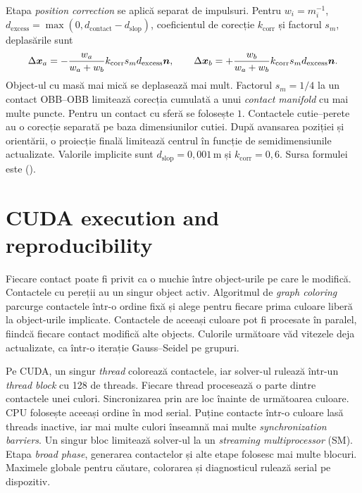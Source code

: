 \documentclass[11pt,a4paper]{article}
\begin{document}
Etapa \emph{position correction} se aplică separat de impulsuri. Pentru
\(w_i=m_i^{-1}\), \(d_{\mathrm{excess}}=\max(0,d_{\mathrm{contact}}-d_{\mathrm{slop}})\),
coeficientul de corecție \(k_{\mathrm{corr}}\) și factorul \(s_m\), deplasările sunt
\begin{equation}
 \Delta\boldsymbol{x}_a=-\frac{w_a}{w_a+w_b}k_{\mathrm{corr}} s_md_{\mathrm{excess}}\boldsymbol{n},
 \qquad
 \Delta\boldsymbol{x}_b=+\frac{w_b}{w_a+w_b}k_{\mathrm{corr}} s_md_{\mathrm{excess}}\boldsymbol{n}.
\end{equation}
Object-ul cu masă mai mică se deplasează mai mult. Factorul
\(s_m=1/4\) la un contact OBB--OBB limitează corecția cumulată
a unui \emph{contact manifold} cu mai multe puncte. Pentru un contact cu
sferă se folosește \(1\). Contactele cutie--perete au o
corecție separată pe baza dimensiunilor cutiei. După avansarea
poziției și orientării, o proiecție finală limitează
centrul în funcție de semidimensiunile actualizate.
Valorile implicite sunt \(d_{\mathrm{slop}}=0{,}001\,\mathrm m\) și
\(k_{\mathrm{corr}}=0{,}6\). Sursa formulei este 
().

\section{CUDA execution and reproducibility}

Fiecare contact poate fi privit ca o muchie între object-urile pe
care le modifică. Contactele cu pereții au un singur object activ.
Algoritmul de \emph{graph coloring} parcurge contactele într-o ordine fixă și alege
pentru fiecare prima culoare liberă la object-urile implicate.
Contactele de aceeași culoare pot fi procesate în paralel,
fiindcă fiecare contact modifică alte objects. Culorile următoare văd vitezele
deja actualizate, ca într-o iterație Gauss--Seidel pe grupuri.

Pe CUDA, un singur \emph{thread} colorează contactele, iar solver-ul
rulează într-un \emph{thread block} cu 128 de threads. Fiecare thread
procesează o parte dintre contactele unei culori. Sincronizarea prin
 are loc înainte
de următoarea culoare. CPU folosește aceeași ordine în mod
serial. Puține contacte într-o culoare lasă threads inactive,
iar mai multe culori înseamnă mai multe \emph{synchronization barriers}.
Un singur bloc limitează solver-ul la un \emph{streaming multiprocessor}
(SM). Etapa \emph{broad phase}, generarea contactelor și alte etape
folosesc mai multe blocuri. Maximele
globale pentru căutare, colorarea și diagnosticul rulează
serial pe dispozitiv.
\end{document}
